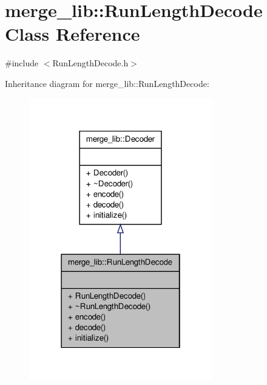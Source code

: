 \hypertarget{classmerge__lib_1_1_run_length_decode}{\section{merge\-\_\-lib\-:\-:Run\-Length\-Decode Class Reference}
\label{dc/d82/classmerge__lib_1_1_run_length_decode}
}


{\ttfamily \#include $<$Run\-Length\-Decode.\-h$>$}



Inheritance diagram for merge\-\_\-lib\-:\-:Run\-Length\-Decode\-:
\nopagebreak
\begin{figure}[H]
\begin{center}
\leavevmode
\includegraphics[width=226pt]{d4/d42/classmerge__lib_1_1_run_length_decode__inherit__graph}
\end{center}
\end{figure}


